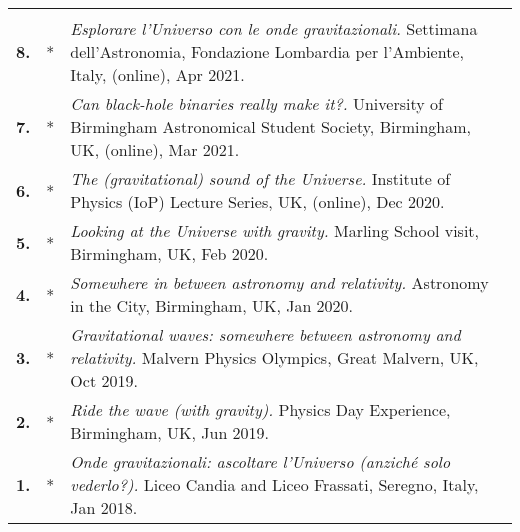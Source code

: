 {\begin{longtable}{rp{0.3cm}p{15.8cm}}
\vspace{0.05cm}\\
%
\textbf{8.} & * & \textit{Esplorare l'Universo con le onde gravitazionali.}
\newline{}
Settimana dell'Astronomia, Fondazione Lombardia per l'Ambiente, Italy, (online), Apr 2021.
\vspace{0.05cm}\\
%
\textbf{7.} & * & \textit{Can black-hole binaries really make it?.}
\newline{}
University of Birmingham Astronomical Student Society,  Birmingham, UK, (online), Mar 2021.
\vspace{0.05cm}\\
%
\textbf{6.} & * & \textit{The (gravitational) sound of the Universe.}
\newline{}
Institute of Physics (IoP) Lecture Series, UK, (online), Dec 2020.
\vspace{0.05cm}\\
%
\textbf{5.} & * & \textit{Looking at the Universe with gravity.}
\newline{}
Marling School visit, Birmingham, UK, Feb 2020.
\vspace{0.05cm}\\
%
\textbf{4.} & * & \textit{Somewhere in between astronomy and relativity.}
\newline{}
Astronomy in the City, Birmingham, UK, Jan 2020.
\vspace{0.05cm}\\
%
\textbf{3.} & * & \textit{Gravitational waves: somewhere between astronomy and relativity.}
\newline{}
Malvern Physics Olympics, Great Malvern, UK, Oct 2019.
\vspace{0.05cm}\\
%
\textbf{2.} & * & \textit{Ride the wave (with gravity).}
\newline{}
Physics Day Experience, Birmingham, UK, Jun 2019.
\vspace{0.05cm}\\
%
\textbf{1.} & * & \textit{Onde gravitazionali: ascoltare l'Universo (anzich\'e solo vederlo?).}
\newline{}
Liceo Candia and Liceo Frassati, Seregno, Italy, Jan 2018.
\vspace{0.05cm}\\
%
\end{longtable} }